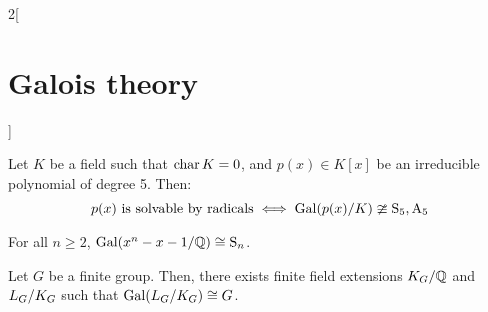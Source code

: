 \documentclass[../../../main.tex]{subfiles}
\begin{document}
\begin{multicols}{2}[\section{Galois theory}]
\begin{prop}
    Let $K$ be a field such that $\operatorname{char} K=0$, and $p(x)\in K[x]$ be an irreducible polynomial of degree 5. Then:
    $$\textstyle p(x)\text{ is solvable by radicals}\iff\Gal(\quot{p(x)}{K})\ncong\text{S}_5,\text{A}_5$$
  \end{prop}
  \begin{theorem}
    For all $n\geq 2$, $\operatorname{Gal}(x^n-x-1/\mathbb{Q})\cong \text{S}_n$.
  \end{theorem}
  \begin{corollary}
    Let $G$ be a finite group. Then, there exists finite field extensions $\quot{K_G}{\QQ}$ and $\quot{L_G}{K_G}$ such that $\Gal(\quot{L_G}{K_G})\cong G$.
  \end{corollary}
\end{multicols}
\end{document}
